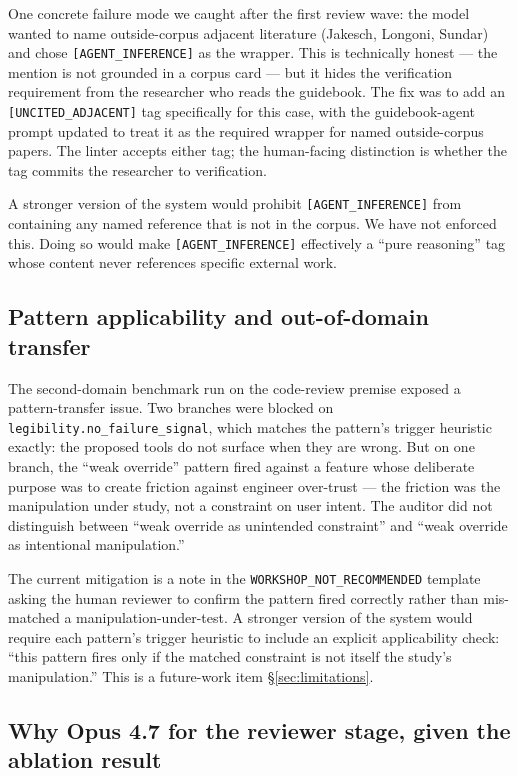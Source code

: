 One concrete failure mode we caught after the first review wave: the model wanted to name outside-corpus adjacent literature (Jakesch, Longoni, Sundar) and chose \texttt{[AGENT\_INFERENCE]} as the wrapper. This is technically honest --- the mention is not grounded in a corpus card --- but it hides the verification requirement from the researcher who reads the guidebook. The fix was to add an \texttt{[UNCITED\_ADJACENT]} tag specifically for this case, with the guidebook-agent prompt updated to treat it as the required wrapper for named outside-corpus papers. The linter accepts either tag; the human-facing distinction is whether the tag commits the researcher to verification.

A stronger version of the system would prohibit \texttt{[AGENT\_INFERENCE]} from containing any named reference that is not in the corpus. We have not enforced this. Doing so would make \texttt{[AGENT\_INFERENCE]} effectively a ``pure reasoning'' tag whose content never references specific external work.

\subsection{Pattern applicability and out-of-domain transfer}

The second-domain benchmark run on the code-review premise exposed a pattern-transfer issue. Two branches were blocked on \texttt{legibility.no\_failure\_signal}, which matches the pattern's trigger heuristic exactly: the proposed tools do not surface when they are wrong. But on one branch, the ``weak override'' pattern fired against a feature whose deliberate purpose was to create friction against engineer over-trust --- the friction was the manipulation under study, not a constraint on user intent. The auditor did not distinguish between ``weak override as unintended constraint'' and ``weak override as intentional manipulation.''

The current mitigation is a note in the \texttt{WORKSHOP\_NOT\_RECOMMENDED} template asking the human reviewer to confirm the pattern fired correctly rather than mis-matched a manipulation-under-test. A stronger version of the system would require each pattern's trigger heuristic to include an explicit applicability check: ``this pattern fires only if the matched constraint is not itself the study's manipulation.'' This is a future-work item \S\ref{sec:limitations}.

\subsection{Why Opus 4.7 for the reviewer stage, given the ablation result}

